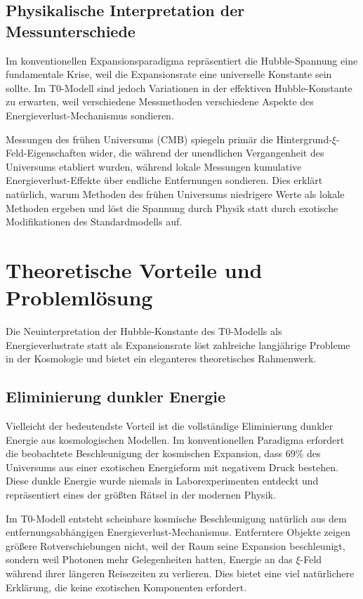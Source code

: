 \documentclass[12pt,a4paper]{article}
\begin{document}
	\subsection{Physikalische Interpretation der Messunterschiede}
	
	Im konventionellen Expansionsparadigma repräsentiert die Hubble-Spannung eine fundamentale Krise, weil die Expansionsrate eine universelle Konstante sein sollte. Im T0-Modell sind jedoch Variationen in der effektiven Hubble-Konstante zu erwarten, weil verschiedene Messmethoden verschiedene Aspekte des Energieverlust-Mechanismus sondieren.
	
	Messungen des frühen Universums (CMB) spiegeln primär die Hintergrund-$\xi$-Feld-Eigenschaften wider, die während der unendlichen Vergangenheit des Universums etabliert wurden, während lokale Messungen kumulative Energieverlust-Effekte über endliche Entfernungen sondieren. Dies erklärt natürlich, warum Methoden des frühen Universums niedrigere Werte als lokale Methoden ergeben und löst die Spannung durch Physik statt durch exotische Modifikationen des Standardmodells auf.
	
	\section{Theoretische Vorteile und Problemlösung}
	
	Die Neuinterpretation der Hubble-Konstante des T0-Modells als Energieverlustrate statt als Expansionsrate löst zahlreiche langjährige Probleme in der Kosmologie und bietet ein eleganteres theoretisches Rahmenwerk.
	
	\subsection{Eliminierung dunkler Energie}
	
	Vielleicht der bedeutendste Vorteil ist die vollständige Eliminierung dunkler Energie aus kosmologischen Modellen. Im konventionellen Paradigma erfordert die beobachtete Beschleunigung der kosmischen Expansion, dass 69\% des Universums aus einer exotischen Energieform mit negativem Druck bestehen. Diese dunkle Energie wurde niemals in Laborexperimenten entdeckt und repräsentiert eines der größten Rätsel in der modernen Physik.
	
	Im T0-Modell entsteht scheinbare kosmische Beschleunigung natürlich aus dem entfernungsabhängigen Energieverlust-Mechanismus. Entferntere Objekte zeigen größere Rotverschiebungen nicht, weil der Raum seine Expansion beschleunigt, sondern weil Photonen mehr Gelegenheiten hatten, Energie an das $\xi$-Feld während ihrer längeren Reisezeiten zu verlieren. Dies bietet eine viel natürlichere Erklärung, die keine exotischen Komponenten erfordert.
	
\end{document}
